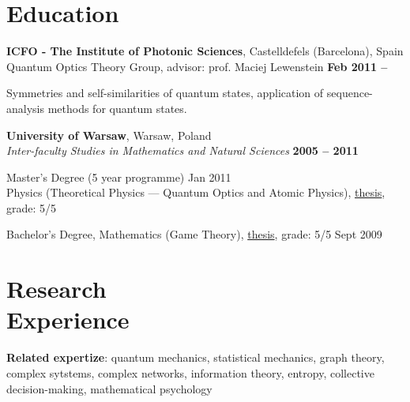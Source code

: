 \documentclass[margin,line]{resume}
\begin{document}
\begin{resume}
    \section{\mysidestyle Education}
    
    {\bf ICFO - The Institute of Photonic Sciences},  Castelldefels (Barcelona), Spain \\%
    Quantum Optics Theory Group, advisor: prof. Maciej Lewenstein \hfill {\bf Feb 2011 -- }\\
   \begin{list2}
        \vspace*{-4mm}
        \item Symmetries and self-similarities of quantum states, application of sequence-analysis methods for quantum states.
    \end{list2}

    {\bf University of Warsaw}, Warsaw, Poland \\
    {\sl Inter-faculty Studies in Mathematics and Natural Sciences} \hfill {\bf 2005 -- 2011}\\
    \begin{list2}
      \vspace*{-4mm}
      \item Master's Degree  (5 year programme) {\hfill Jan 2011}\\
      Physics (Theoretical Physics --- Quantum Optics and Atomic Physics),
      \href{http://migdal.wikidot.com/en:collective-decoherence}{thesis}, grade: 5/5
      \item Bachelor's Degree, Mathematics (Game Theory),
      \href{http://migdal.wikidot.com/en:mafia}{thesis}, grade: 5/5 \hfill Sept 2009
    \end{list2}
    
\vspace{3mm}

    \section{\mysidestyle Research\\Experience}

    \begin{list2}
    \item {\bf Related expertize}: quantum mechanics, statistical mechanics, graph theory, complex sytstems, complex networks, information theory, entropy, collective decision-making, mathematical psychology


\end{list2}
\end{resume}
\end{document}
